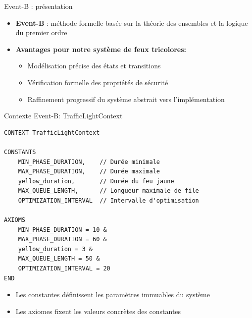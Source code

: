 \begin{frame}{Event-B : présentation}
  \begin{itemize}
    \item<1-> \textbf{Event-B} : méthode formelle basée sur la théorie des ensembles et la logique du premier ordre
    \item<2-> \textbf{Avantages pour notre système de feux tricolores:}
    \begin{itemize}
      \item Modélisation précise des états et transitions
      \item Vérification formelle des propriétés de sécurité
      \item Raffinement progressif du système abstrait vers l'implémentation
    \end{itemize}
  \end{itemize}
  
\end{frame}

\begin{frame}[fragile]{Contexte Event-B: TrafficLightContext}
  \begin{lstlisting}[style=EventB]
CONTEXT TrafficLightContext

CONSTANTS
    MIN_PHASE_DURATION,    // Durée minimale
    MAX_PHASE_DURATION,    // Durée maximale
    yellow_duration,       // Durée du feu jaune
    MAX_QUEUE_LENGTH,      // Longueur maximale de file
    OPTIMIZATION_INTERVAL  // Intervalle d'optimisation

AXIOMS
    MIN_PHASE_DURATION = 10 &
    MAX_PHASE_DURATION = 60 &
    yellow_duration = 3 &
    MAX_QUEUE_LENGTH = 50 &
    OPTIMIZATION_INTERVAL = 20
END
  \end{lstlisting}
  
  \begin{itemize}
    \item Les constantes définissent les paramètres immuables du système
    \item Les axiomes fixent les valeurs concrètes des constantes
  \end{itemize}
\end{frame}

